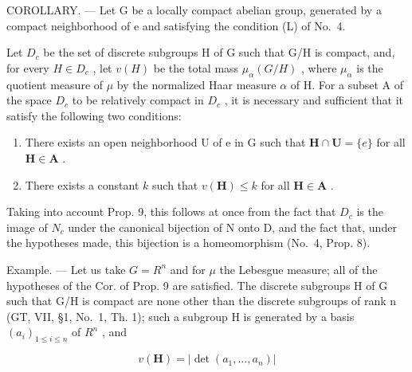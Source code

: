 COROLLARY. --- Let G be a locally compact abelian group, generated by a compact neighborhood of e and satisfying the condition (L) of No.~4.

Let \(D_c\) be the set of discrete subgroups H of G such that G/H is compact, and, for every \(H \in D_c\) , let \(v(H)\) be the total mass \(\mu_\alpha(G/H)\) , where \(\mu_\alpha\) is the quotient measure of \(\mu\) by the normalized Haar measure \(\alpha\) of H. For a subset A of the space \(D_c\) to be relatively compact in \(D_c\) , it is necessary and sufficient that it satisfy the following two conditions:

\begin{enumerate}
\def\labelenumi{(\roman{enumi})}
\item
  There exists an open neighborhood U of e in G such that \(\mathbf{H} \cap \mathbf{U} = \{e\}\) for all \(\mathbf{H} \in \mathbf{A}\) .
\item
  There exists a constant \(k\) such that \(v(\mathbf{H}) \leqslant k\) for all \(\mathbf{H} \in \mathbf{A}\) .
\end{enumerate}

Taking into account Prop. 9, this follows at once from the fact that \(D_{c}\) is the image of \(N_{c}\) under the canonical bijection of N onto D, and the fact that, under the hypotheses made, this bijection is a homeomorphism (No.~4, Prop. 8).

Example. --- Let us take \(G = R^{n}\) and for \(\mu\) the Lebesgue measure; all of the hypotheses of the Cor. of Prop. 9 are satisfied. The discrete subgroups H of G such that G/H is compact are none other than the discrete subgroups of rank n (GT, VII, §1, No.~1, Th. 1); such a subgroup H is generated by a basis \((a_{i})_{1 \leqslant i \leqslant n}\) of \(R^{n}\) , and

\[
v (\mathbf {H}) = | \det (a _ {1}, \dots , a _ {n}) |
\]

